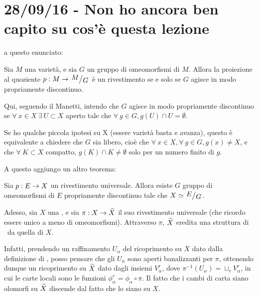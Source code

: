 \chapter{28/09/16 - Non ho ancora ben capito su cos'è questa lezione}
\justify

 a questo enunciato:
\begin{teorema}
	Sia $M$ una varietà, e sia $G$ un gruppo di omeomorfismi di $M$.
 	Allora la proiezione al quoziente $p:M\rar \quoziente{M}{G}$ è un rivestimento se e solo se $G$ agisce in modo propriamente discontinuo.
\end{teorema}

Qui, seguendo il Manetti, intendo che $G$ agisce in modo propriamente discontinuo se $\forall\ x\in X\ \exists\ U\subset X$ aperto tale che $\forall\ g\in G, g(U)\cap U=\emptyset$. 

Se ho qualche piccola ipotesi su X (essere varietà basta e avanza), questo è equivalente a chiedere che $G$ sia libero, cioè che $\forall\ x \in X, \forall\ g\in G, g(x)\neq X$, e che $\forall\ K \subset X$ compatto, $g(K)\cap K \neq \emptyset$ solo per un numero finito di $g$.

A questo aggiungo un altro teorema:

\begin{teorema} \label{rivuniv}
 	Sia $p:E\rightarrow X$ un rivestimento universale. Allora esiste $G$ gruppo di omeomorfismi di $E$ propriamente discontinuo tale che $X\isom\quoziente{E}{G}$.
\end{teorema}

Adesso, sia $X$ una \sdR, e sia $\pi:X\rightarrow\widetilde{X}$ il suo rivestimento universale (che ricordo essere unico a meno di omeomorfismi). Attraverso $\pi$, $\widetilde{X}$ eredita una struttura di \sdR\ da quella di $X$.

Infatti, prendendo un raffinamento $U_\alpha$ del ricoprimento su $X$ dato dalla definizione di \sdR, posso pensare che gli $U_\alpha$ sono aperti banalizzanti per $\pi$, ottenendo dunque un ricoprimento su $\widetilde{X}$ dato dagli insiemi $V_\alpha^r$, dove $\pi^{-1}(U_\alpha)=\sqcup_r V_\alpha^r$, in cui le carte locali sono le funzioni $\phi_\alpha^r=\phi_\alpha\circ\pi$. Il fatto che i cambi di carta siano olomorfi su $\widetilde{X}$ discende dal fatto che lo siano su $X$.


